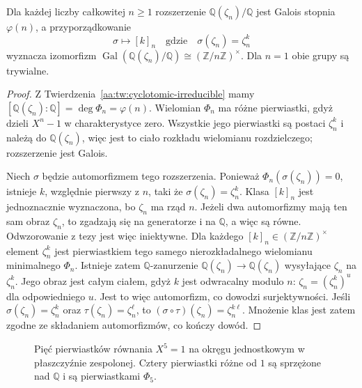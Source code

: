 \begin{twierdzenie}
\label{aa:tw:cyclotomic-galois}
Dla każdej liczby całkowitej $n\ge1$ rozszerzenie
$\mathbb Q(\zeta_n)/\mathbb Q$ jest Galois stopnia
$\varphi(n)$, a przyporządkowanie
\[
\sigma\longmapsto [k]_n\quad\text{gdzie}\quad
\sigma(\zeta_n)=\zeta_n^k
\]
wyznacza izomorfizm
\(\operatorname{Gal}(\mathbb Q(\zeta_n)/\mathbb Q)
\cong(\mathbb Z/n\mathbb Z)^\times\).
Dla $n=1$ obie grupy są trywialne.
\end{twierdzenie}
\begin{proof}
Z Twierdzenia~\ref{aa:tw:cyclotomic-irreducible} mamy
$[\mathbb Q(\zeta_n):\mathbb Q]=\deg\Phi_n=\varphi(n)$.
Wielomian $\Phi_n$ ma różne pierwiastki, gdyż dzieli
$X^n-1$ w charakterystyce zero. Wszystkie jego
pierwiastki są postaci $\zeta_n^k$ i należą do
$\mathbb Q(\zeta_n)$, więc jest to ciało rozkładu
wielomianu rozdzielczego; rozszerzenie jest Galois.

Niech $\sigma$ będzie automorfizmem tego rozszerzenia.
Ponieważ $\Phi_n(\sigma(\zeta_n))=0$,
istnieje $k$, względnie pierwszy z $n$, taki że
$\sigma(\zeta_n)=\zeta_n^k$. Klasa $[k]_n$ jest
jednoznacznie wyznaczona, bo $\zeta_n$ ma rząd $n$.
Jeżeli dwa automorfizmy mają ten sam obraz $\zeta_n$,
to zgadzają się na generatorze i na $\mathbb Q$, a
więc są równe. Odwzorowanie z tezy jest więc iniektywne.
Dla każdego $[k]_n\in(\mathbb Z/n\mathbb Z)^\times$
element $\zeta_n^k$ jest pierwiastkiem tego samego
nierozkładalnego wielomianu minimalnego $\Phi_n$.
Istnieje zatem $\mathbb Q$-zanurzenie
$\mathbb Q(\zeta_n)\to\mathbb Q(\zeta_n)$
wysyłające $\zeta_n$ na $\zeta_n^k$. Jego obraz jest
całym ciałem, gdyż $k$ jest odwracalny modulo $n$:
$\zeta_n=(\zeta_n^k)^u$ dla odpowiedniego $u$.
Jest to więc automorfizm, co dowodzi surjektywności.
Jeśli $\sigma(\zeta_n)=\zeta_n^k$ oraz
$\tau(\zeta_n)=\zeta_n^\ell$, to
$(\sigma\circ\tau)(\zeta_n)=\zeta_n^{k\ell}$.
Mnożenie klas jest zatem zgodne ze składaniem
automorfizmów, co kończy dowód.
\end{proof}

\begin{figure}[htbp]
\centering
{}
\caption{Pięć pierwiastków równania $X^5=1$ na okręgu jednostkowym
w płaszczyźnie zespolonej. Cztery pierwiastki różne od $1$ są
sprzężone nad $\mathbb Q$ i są pierwiastkami $\Phi_5$.}
\label{aa:fig:cyclotomic-five}
\end{figure}

